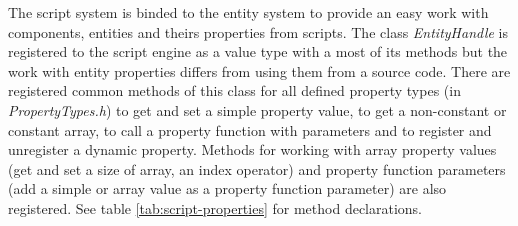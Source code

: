 The script system is binded to the entity system to provide an easy work with components, entities and theirs properties from scripts. The class \emph{EntityHandle} is registered to the script engine as a value type with a most of its methods but the work with entity properties differs from using them from a source code. There are registered common methods of this class for all defined property types (in \emph{PropertyTypes.h}) to get and set a simple property value, to get a non-constant or constant array, to call a property function with parameters and to register and unregister a dynamic property. Methods for working with array property values (get and set a size of array, an index operator) and property function parameters (add a simple or array value as a property function parameter) are also registered. See table \ref{tab:script-properties} for method declarations.

